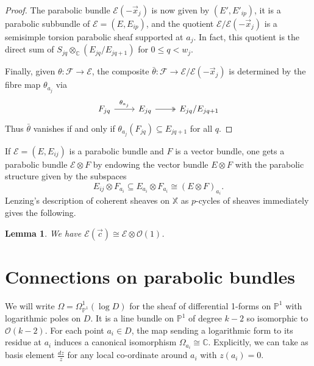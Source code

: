 \documentclass[12pt,a4paper]{amsart}
\theoremstyle{plain}
\newtheorem{lem}[thm]{Lemma}
\newcommand{\C}{\mathbb C}
\newcommand{\PP}{\mathbb P}
\newcommand{\OO}{\mathcal O}
\newcommand{\F}{\mathcal F}
\newcommand{\E}{\mathcal E}
\newcommand{\XX}{\mathbb X}
\newcommand{\ox}{\vec x}
\newcommand{\oc}{\vec c}
\begin{document}
\begin{proof}
The parabolic bundle $\E(-\ox_j)$ is now given by $(E',E'_{ip})$, it is a parabolic subbundle of $\E=(E,E_{ip})$, and the quotient $\E/\E(-\ox_j)$ is a semisimple torsion parabolic sheaf supported at $a_j$. In fact, this quotient is the direct sum of $S_{jq}\otimes_\C(E_{jq}/E_{jq+1})$ for $0\leq q<w_j$.

Finally, given $\theta\colon\F\to\E$, the composite $\bar\theta\colon\F\to\E/\E(-\ox_j)$ is determined by the fibre map $\theta_{a_j}$ via
\[ \begin{tikzcd}
F_{jq} \arrow[r,"\theta_{a_j}"] & E_{jq} \arrow[r,two heads] & E_{jq}/E_{jq+1}
\end{tikzcd} \]
Thus $\bar\theta$ vanishes if and only if $\theta_{a_j}(F_{jq})\subseteq E_{jq+1}$ for all $q$.    
\end{proof}


If $\E = (E,E_{ij})$ is a parabolic bundle and $F$ is a vector bundle, one gets a parabolic bundle $\E\otimes F$ by endowing the vector bundle $E\otimes F$ with the parabolic structure given by the subspaces
\[
E_{ij}\otimes F_{a_i} \subseteq E_{a_i}\otimes F_{a_i} \cong (E\otimes F)_{a_i}.
\]
Lenzing's description of coherent sheaves on $\XX$ as $p$-cycles of sheaves \cite[\S4.1]{L} immediately gives the following.



\begin{lem}
\label{l:ctwist}
We have $\E(\oc)\cong \E\otimes \OO(1)$.
\end{lem}





























\section{Connections on parabolic bundles}

We will write $\Omega = \Omega^1_{\PP^1} (\log D)$ for the sheaf of differential 1-forms on $\PP^1$ with logarithmic poles on $D$. It is a line bundle on $\PP^1$ of degree $k-2$ so isomorphic to $\OO(k-2)$. For each point $a_i\in D$, the map sending a logarithmic form to its residue at $a_i$ induces a canonical isomorphism $\Omega_{a_i}\cong\C$. Explicitly, we can take as basis element $\frac{dz}{z}$ for any local co-ordinate around $a_i$ with $z(a_i)=0$.
\end{document}

